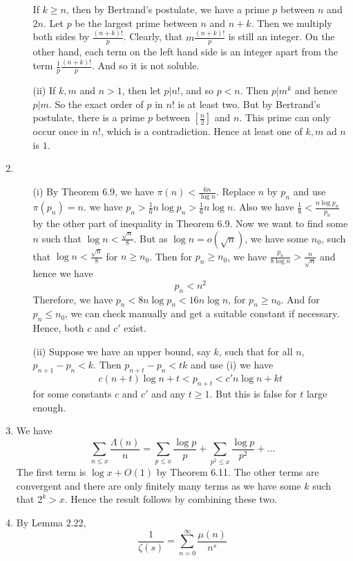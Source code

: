 \begin{enumerate}
\begin{enumerate}
If $k \ge n$, then by Bertrand's postulate, we have a prime $p$ between $n$ and $2n$. Let $p$ be the largest prime between $n$ and $n+k$. Then we multiply both sides by $\frac{(n+k)!}{p}$. Clearly, that $m\frac{(n+k)!}{p}$ is still an integer. On the other hand, each term on the left hand side is an integer apart from the term $\frac{1}{p} \frac{(n+k)!}{p}$.  And so it is not soluble.

\item[(ii)] If $k,m$ and $n>1$, then let $p \big| n!$, and so $p<n$. Then $p|m^k$ and hence $p|m$.
So the exact order of $p$ in $n!$ is at least two. But by Bertrand's postulate, there is a prime
$p$ between $[\frac{n}{2}]$ and $n$. This prime can only occur once in $n!$, which is a contradiction. Hence at least one of $k,m$ ad $n$ is $1$.
      \end{enumerate}
\item  \begin{enumerate}
\item[(i)] By Theorem 6.9, we have $\pi(n) < \frac{6n}{\log{n}}$. Replace $n$ by $p_n$ and use $\pi(p_n)=n$. we have $p_n>\frac{1}{6}n\log{p_n}>\frac{1}{6}n\log{n}$.
    Also we have $\frac{1}{8} <\frac{n \log{p_n}}{p_n}$ by the other part of inequality in Theorem 6.9.
    Now we want to find some $n$ such that $\log{n} < \frac{\sqrt{n}}{8}$. But as $\log{n}=o(\sqrt{n})$,
    we have some $n_0$, such that $\log{n} < \frac{\sqrt{n}}{8}$ for $n \ge n_0$.
    Then for $p_n \ge n_0$, we have $\frac{p_n}{8\log{n}} >\frac{n}{\sqrt{n}}$ and hence we have
    $$p_n < n^2$$
    Therefore, we have $p_n < 8n\log{p_n} <16n\log{n}$, for $p_n \ge n_0$. And for $p_n \le n_0$, we can
    check manually and get a suitable constant if necessary. Hence, both $c$ and $c'$ exist.
\item[(ii)] Suppose we have an upper bound, say $k$, such that for all $n$, $p_{n+1}-p_n < k$.
    Then $p_{n+t}-p_n < tk$ and use (i) we have
    $$c(n+t)\log{n+t}<p_{n+t}<c'n \log{n}+kt$$
    for some constants $c$ and $c'$ and any $t \ge 1$. But this is false for $t$ large enough.
    \end{enumerate}
\item We have
$$\sum_{n \le x}\frac{\Lambda(n)}{n}=\sum_{p \le x}\frac{\log{p}}{p}+\sum_{p^2 \le x} \frac{\log{p}}{p^2}+\ldots$$
    The first term is $\log{x}+O(1)$ by Theorem 6.11. The other terms are convergent and there are only finitely many terms as we have some $k$ such that $2^k > x$. Hence the result follows by combining these two.
\item By Lemma 2.22, $$\frac{1}{\zeta(s)}=\sum_{n=0}^\infty \frac{\mu(n)}{n^s}$$

\end{enumerate}
